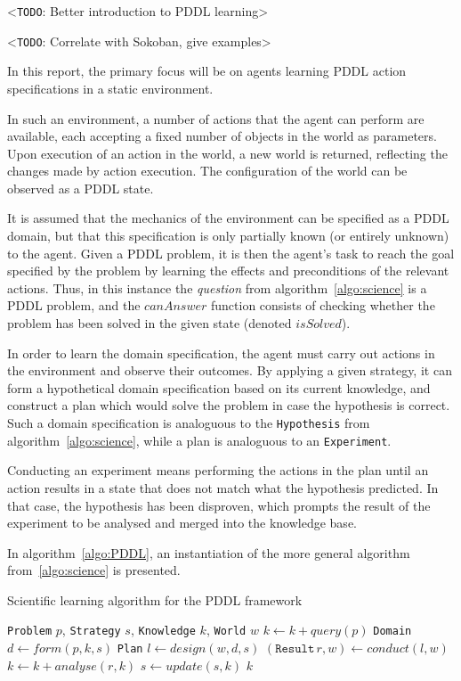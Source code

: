 \documentclass[../Master.tex]{subfiles}
\begin{document}
<\texttt{TODO}: Better introduction to PDDL learning>

<\texttt{TODO}: Correlate with Sokoban, give examples>

In this report, the primary focus will be on agents learning PDDL action specifications in a static environment.

In such an environment, a number of actions that the agent can perform are available, each accepting a fixed number of objects in the world as parameters. Upon execution of an action in the world, a new world is returned, reflecting the changes made by action execution. The configuration of the world can be observed as a PDDL state.

It is assumed that the mechanics of the environment can be specified as a PDDL domain, but that this specification is only partially known (or entirely unknown) to the agent. Given a PDDL problem, it is then the agent's task to reach the goal specified by the problem by learning the effects and preconditions of the relevant actions. Thus, in this instance the \textit{question} from algorithm~\ref{algo:science} is a PDDL problem, and the $canAnswer$ function consists of checking whether the problem has been solved in the given state (denoted $isSolved$).

In order to learn the domain specification, the agent must carry out actions in the environment and observe their outcomes. By applying a given strategy, it can form a hypothetical domain specification based on its current knowledge, and construct a plan which would solve the problem in case the hypothesis is correct. Such a domain specification is analoguous to the \texttt{Hypothesis} from algorithm~\ref{algo:science}, while a plan is analoguous to an \texttt{Experiment}.

Conducting an experiment means performing the actions in the plan until an action results in a state that does not match what the hypothesis predicted. In that case, the hypothesis has been disproven, which prompts the result of the experiment to be analysed and merged into the knowledge base.

In algorithm~\ref{algo:PDDL}, an instantiation of the more general algorithm from~\ref{algo:science} is presented.

\begin{algorithm}
    \caption{Scientific learning algorithm for the PDDL framework}\label{algo:PDDL}
    \begin{algorithmic}
         {\texttt{Problem} $p$, \texttt{Strategy} $s$, \texttt{Knowledge} $k$, \texttt{World} $w$}
                \State $k \gets k + query(p)$
                \State \texttt{Domain} $d \gets form(p, k, s)$
                \State \texttt{Plan} $l \gets design(w, d, s)$
                \State $(\texttt{Result} \, r, w) \gets conduct(l, w)$
                \State $k \gets k + analyse(r, k)$
                \State $s \gets update(s, k)$
            \EndWhile
            \State \Return $k$
        \EndFunction
    \end{algorithmic}
\end{algorithm}
\end{document}
